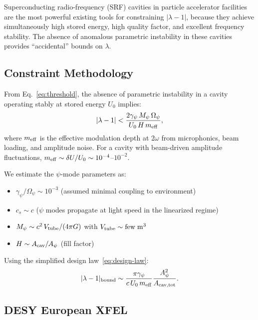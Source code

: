 \documentclass[aps,prd,twocolumn,superscriptaddress,floatfix,nofootinbib]{revtex4-2}
\newcommand{\Opsi}{\Omega_\psi}
\newcommand{\gpsi}{\gamma_\psi}
\newcommand{\Mpsi}{M_\psi}
\newcommand{\lam}{\lambda}
\begin{document}
Superconducting radio-frequency (SRF) cavities in particle accelerator
facilities are the most powerful existing tools for constraining
$|\lambda - 1|$, because they achieve simultaneously high stored energy,
high quality factor, and excellent frequency stability. The absence of
anomalous parametric instability in these cavities provides ``accidental''
bounds on $\lambda$.

\subsection{Constraint Methodology}\label{sec:srf-method}

From Eq.~\eqref{eq:threshold}, the absence of parametric instability
in a cavity operating stably at stored energy $U_0$ implies:
\begin{equation}
|\lam - 1| < \frac{2\gpsi\,\Mpsi\,\Opsi}{U_0\,H\,m_{\rm eff}},
\label{eq:srf-bound}
\end{equation}
where $m_{\rm eff}$ is the effective modulation depth at $2\omega$ from
microphonics, beam loading, and amplitude noise. For a cavity with
beam-driven amplitude fluctuations,
$m_{\rm eff} \sim \delta U/U_0 \sim 10^{-4}$--$10^{-2}$.

We estimate the $\psi$-mode parameters as:
\begin{itemize}[nosep]
\item $\gpsi/\Opsi \sim 10^{-3}$ (assumed minimal coupling to
environment)
\item $c_s \sim c$ ($\psi$ modes propagate at light speed in the
linearized regime)
\item $\Mpsi \sim c^2\,V_{\rm tube}/(4\pi G)$ with
$V_{\rm tube} \sim \text{few}\;\si{m^3}$
\item $H \sim A_{\rm cav}/A_\psi$ (fill factor)
\end{itemize}

Using the simplified design law~\eqref{eq:design-law}:
\begin{equation}
|\lam-1|_{\rm bound} \sim \frac{\pi\gpsi}{c\,U_0\,m_{\rm eff}}
\frac{A_\psi^2}{A_{\rm cav,tot}}.
\label{eq:bound-simplified}
\end{equation}

\subsection{DESY European XFEL}\label{sec:desy}
\end{document}
